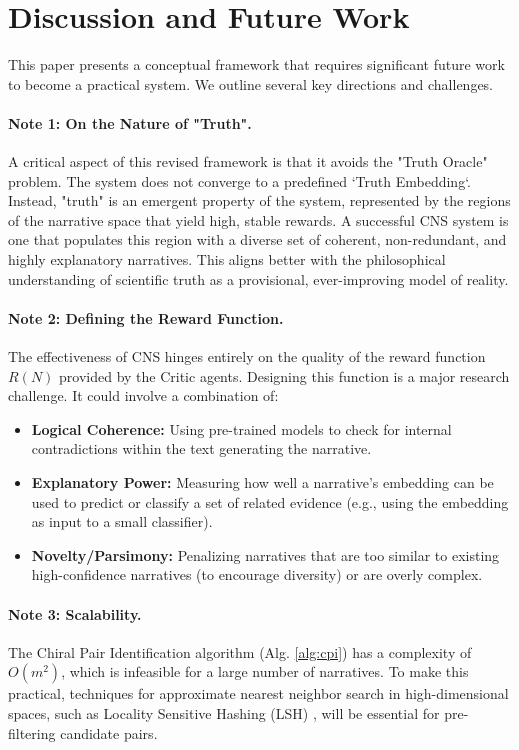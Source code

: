 \documentclass[12pt, a4paper]{article}
\begin{document}
\section{Discussion and Future Work}

This paper presents a conceptual framework that requires significant future work to become a practical system. We outline several key directions and challenges.

\paragraph{Note 1: On the Nature of "Truth".}
A critical aspect of this revised framework is that it avoids the "Truth Oracle" problem. The system does not converge to a predefined `Truth Embedding`. Instead, "truth" is an emergent property of the system, represented by the regions of the narrative space that yield high, stable rewards. A successful CNS system is one that populates this region with a diverse set of coherent, non-redundant, and highly explanatory narratives. This aligns better with the philosophical understanding of scientific truth as a provisional, ever-improving model of reality.

\paragraph{Note 2: Defining the Reward Function.}
The effectiveness of CNS hinges entirely on the quality of the reward function $R(N)$ provided by the Critic agents. Designing this function is a major research challenge. It could involve a combination of:
\begin{itemize}
    \item \textbf{Logical Coherence:} Using pre-trained models to check for internal contradictions within the text generating the narrative.
    \item \textbf{Explanatory Power:} Measuring how well a narrative's embedding can be used to predict or classify a set of related evidence (e.g., using the embedding as input to a small classifier).
    \item \textbf{Novelty/Parsimony:} Penalizing narratives that are too similar to existing high-confidence narratives (to encourage diversity) or are overly complex.
\end{itemize}

\paragraph{Note 3: Scalability.}
The Chiral Pair Identification algorithm (Alg. \ref{alg:cpi}) has a complexity of $O(m^2)$, which is infeasible for a large number of narratives. To make this practical, techniques for approximate nearest neighbor search in high-dimensional spaces, such as Locality Sensitive Hashing (LSH) \cite{Indyk1998LSH}, will be essential for pre-filtering candidate pairs.
\end{document}
